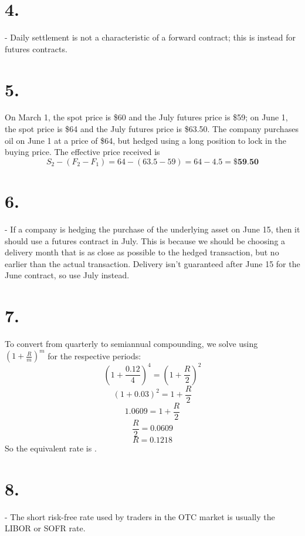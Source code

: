 \documentclass{article}
\begin{document}
{\Large 

\section*{4.}

 - Daily settlement is not a characteristic of a forward contract; this is instead for futures contracts.

}
{\Large 

\section*{5.}

On March 1, the spot price is \$60 and the July futures price is \$59; on June 1, the spot price is \$64 and the July futures price is \$63.50. The company purchases oil on June 1 at a price of \$64, but hedged using a long position to lock in the buying price. The effective price received is 
\[
  S_2 - (F_2 - F_1) = 64 - (63.5 - 59) = 64 - 4.5 = \boxed{\textbf{\$59.50}}
\]

}
{\Large 

\section*{6.}

 - If a company is hedging the purchase of the underlying asset on June 15, then it should use a futures contract in July. This is because we should be choosing a delivery month that is as close as possible to the hedged transaction, but no earlier than the actual transaction. Delivery isn't guaranteed after June 15 for the June contract, so use July instead.

}
{\Large 

\section*{7.}
To convert from quarterly to semiannual compounding, we solve using \((1 + \frac{R}{m})^m\) for the respective periods:
\[
  (1 + \frac{0.12}{4})^4 = (1 + \frac{R}{2})^2
\]
\[
  (1 + 0.03)^2 = 1 + \frac{R}{2}
\]
\[
  1.0609 = 1 + \frac{R}{2}
\]
\[
  \frac{R}{2} = 0.0609 
\]
\[
  R = 0.1218
\]
So the equivalent rate is .

}
{\Large 

\section*{8.}

 - The short risk-free rate used by traders in the OTC market is usually the LIBOR or SOFR rate. 

}
\end{document}
